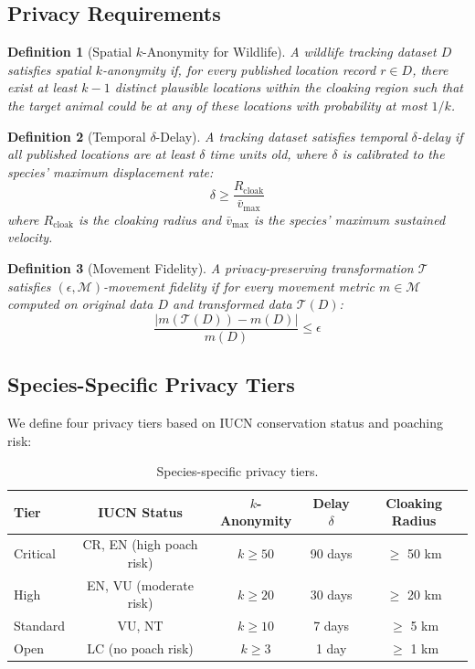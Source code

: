 \documentclass[11pt,letterpaper]{article}
\newtheorem{definition}{Definition}[section]
\begin{document}
\subsection{Privacy Requirements}

\begin{definition}[Spatial $k$-Anonymity for Wildlife]
A wildlife tracking dataset $D$ satisfies spatial $k$-anonymity if, for every published location record $r \in D$, there exist at least $k-1$ distinct plausible locations within the cloaking region such that the target animal could be at any of these locations with probability at most $1/k$.
\end{definition}

\begin{definition}[Temporal $\delta$-Delay]
A tracking dataset satisfies temporal $\delta$-delay if all published locations are at least $\delta$ time units old, where $\delta$ is calibrated to the species' maximum displacement rate:
\begin{equation}
\delta \geq \frac{R_{\text{cloak}}}{\bar{v}_{\max}}
\end{equation}
where $R_{\text{cloak}}$ is the cloaking radius and $\bar{v}_{\max}$ is the species' maximum sustained velocity.
\end{definition}

\begin{definition}[Movement Fidelity]
A privacy-preserving transformation $\mathcal{T}$ satisfies $(\epsilon, \mathcal{M})$-movement fidelity if for every movement metric $m \in \mathcal{M}$ computed on original data $D$ and transformed data $\mathcal{T}(D)$:
\begin{equation}
\frac{|m(\mathcal{T}(D)) - m(D)|}{m(D)} \leq \epsilon
\end{equation}
\end{definition}

\subsection{Species-Specific Privacy Tiers}

We define four privacy tiers based on IUCN conservation status and poaching risk:

\begin{table}[htbp]
\centering
\caption{Species-specific privacy tiers.}
\label{tab:tiers}
\begin{tabular}{lcccc}
\toprule
\textbf{Tier} & \textbf{IUCN Status} & $k$\textbf{-Anonymity} & \textbf{Delay} $\delta$ & \textbf{Cloaking Radius} \\
\midrule
Critical & CR, EN (high poach risk) & $k \geq 50$ & 90 days & $\geq$ 50 km \\
High & EN, VU (moderate risk) & $k \geq 20$ & 30 days & $\geq$ 20 km \\
Standard & VU, NT & $k \geq 10$ & 7 days & $\geq$ 5 km \\
Open & LC (no poach risk) & $k \geq 3$ & 1 day & $\geq$ 1 km \\
\bottomrule
\end{tabular}
\end{table}
\end{document}
